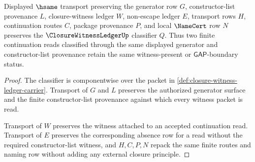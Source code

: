 \begin{theorem}
\label{thm:closure-witness-ledger-classifier-stability}
Displayed $\hsame$ transport preserving the generator row $G$, constructor-list provenance $L$, closure-witness ledger $W$, non-escape ledger $E$, transport rows $H$, continuation routes $C$, package provenance $P$, and local $\NameCert$ row $N$ preserves the $\ClosureWitnessLedgerUp$ classifier $Q$. Thus two finite continuation reads classified through the same displayed generator and constructor-list provenance retain the same witness-present or $\mathsf{GAP}$-boundary status.
\end{theorem}
\begin{proof}
The classifier is componentwise over the packet in \autoref{def:closure-witness-ledger-carrier}. Transport of $G$ and $L$ preserves the authorized generator surface and the finite constructor-list provenance against which every witness packet is read.

Transport of $W$ preserves the witness attached to an accepted continuation read. Transport of $E$ preserves the corresponding absence row for a read without the required constructor-list witness, and $H,C,P,N$ repack the same finite routes and naming row without adding any external closure principle.
\end{proof}

